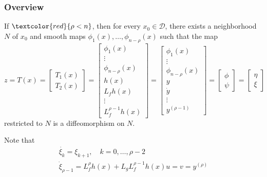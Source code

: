 \subsubsection{Overview}
If $\textcolor{red}{\rho < n}$, then for every $x_0 \in \mathcal{D}$, there exists a neighborhood $N$ of $x_0$ and smooth maps $\phi_1(x), \ldots, \phi_{n - \rho}(x)$ such that the map
    {\small
        \begin{equation*}
            z = T(x) =
            \begin{bmatrix}
                T_1(x) \\
                T_2(x)
            \end{bmatrix} =
            \begin{bmatrix}
                \phi_1(x)          \\
                \vdots             \\
                \phi_{n - \rho}(x) \\
                h(x)               \\
                L_f h(x)           \\
                \vdots             \\
                L_f^{\rho - 1} h(x)
            \end{bmatrix}
            =
            \begin{bmatrix}
                \phi_1(x)          \\
                \vdots             \\
                \phi_{n - \rho}(x) \\
                y                  \\
                \dot{y}            \\
                \vdots             \\
                y^{(\rho - 1)}
            \end{bmatrix}
            =
            \begin{bmatrix}
                \phi \\
                \psi
            \end{bmatrix}=
            \begin{bmatrix}
                \eta \\
                \xi
            \end{bmatrix}
        \end{equation*}
    }
restricted to $N$ is a diffeomorphism on $N$.

Note that
\begin{align*}
    \dot{\xi_k} = \xi_{k+1}, \quad k = 0, \ldots, \rho - 2 \\
    \dot{\xi}_{\rho - 1} = L_f^\rho h(x) + L_g L_f^{\rho - 1} h(x) u = v = y^{(\rho)}
\end{align*}

